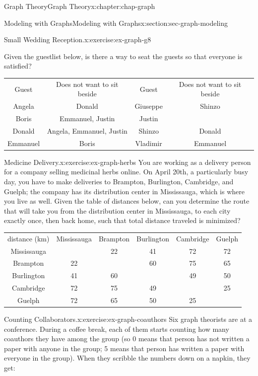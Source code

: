 \documentclass[oneside,10pt,]{book}
\newcommand{\tabularfont}{\relax}
\numberwithin{equation}{section}
\newcommand{\hrulemedium}{\noalign{\hrule height 0.07em}}
\begin{document}
\begin{chapterptx}{Graph Theory}{}{Graph Theory}{}{}{x:chapter:chap-graph}
\begin{sectionptx}{Modeling with Graphs}{}{Modeling with Graphs}{}{}{x:section:sec-graph-modeling}
\begin{inlineexercise}{Small Wedding Reception.}{x:exercise:ex-graph-g8}
\par
Given the guestlist below, is there a way to seat the guests so that everyone is satisfied?%
\begin{sidebyside}{1}{0.025}{0.025}{0}%
\begin{sbspanel}{0.95}%
{\centering%
{\tabularfont%
\begin{tabular}{cccc}
Guest&Does not want  to sit beside&Guest&Does not want  to sit beside\tabularnewline\hrulemedium
Angela&Donald&Giuseppe&Shinzo\tabularnewline[0pt]
Boris&Emmanuel, Justin&Justin&\tabularnewline[0pt]
Donald&Angela, Emmanuel, Justin&Shinzo&Donald\tabularnewline[0pt]
Emmanuel&Boris&Vladimir&Emmanuel
\end{tabular}
}%
\par}
\end{sbspanel}%
\end{sidebyside}%
\end{inlineexercise}
\begin{inlineexercise}{Medicine Delivery.}{x:exercise:ex-graph-herbs}%
You are working as a delivery person for a company selling medicinal herbs online. On April 20th, a particularly busy day, you have to make deliveries to Brampton, Burlington, Cambridge, and Guelph; the company has its distribution center in Mississauga, which is where you live as well. Given the table of distances below, can you determine the route that will take you from the distribution center in Mississauga, to each city exactly once, then back home, such that total distance traveled is minimized?%
\begin{sidebyside}{1}{0.05}{0.05}{0}%
\begin{sbspanel}{0.9}%
{\centering%
{\tabularfont%
\begin{tabular}{cccccc}
distance (km)&Mississauga&Brampton&Burlington&Cambridge&Guelph\tabularnewline\hrulemedium
Mississauga&&22&41&72&72\tabularnewline[0pt]
Brampton&22&&60&75&65\tabularnewline[0pt]
Burlington&41&60&&49&50\tabularnewline[0pt]
Cambridge&72&75&49&&25\tabularnewline[0pt]
Guelph&72&65&50&25&
\end{tabular}
}%
\par}
\end{sbspanel}%
\end{sidebyside}%
\end{inlineexercise}
\begin{inlineexercise}{Counting Collaborators.}{x:exercise:ex-graph-coauthors}%
Six graph theorists are at a conference. During a coffee break, each of them starts counting how many coauthors they have among the group (so 0 means that person has not written a paper with anyone in the group; 5 means that person has written a paper with everyone in the group). When they scribble the numbers down on a napkin, they get:%

\end{inlineexercise}
\end{sectionptx}
\end{chapterptx}
\end{document}
